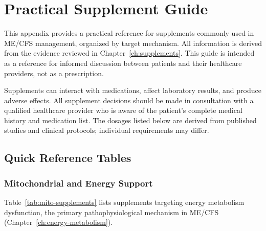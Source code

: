 \chapter{Practical Supplement Guide}
\label{app:supplement-guide}

This appendix provides a practical reference for supplements commonly used in ME/CFS management, organized by target mechanism. All information is derived from the evidence reviewed in Chapter~\ref{ch:supplements}. This guide is intended as a reference for informed discussion between patients and their healthcare providers, not as a prescription.

\begin{warning}
Supplements can interact with medications, affect laboratory results, and produce adverse effects. All supplement decisions should be made in consultation with a qualified healthcare provider who is aware of the patient's complete medical history and medication list. The dosages listed below are derived from published studies and clinical protocols; individual requirements may differ.
\end{warning}

\section{Quick Reference Tables}
\label{sec:supplement-tables}

\subsection{Mitochondrial and Energy Support}

Table~\ref{tab:mito-supplements} lists supplements targeting energy metabolism dysfunction, the primary pathophysiological mechanism in ME/CFS (Chapter~\ref{ch:energy-metabolism}).

